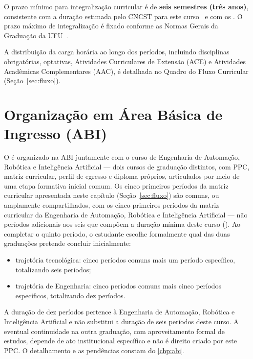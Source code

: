 O prazo mínimo para integralização curricular é de \textbf{seis semestres (três anos)}, consistente com a duração estimada pelo CNCST para este curso~\cite{mec_cncst_2024} e com os \unskip. O prazo máximo de integralização é fixado conforme as Normas Gerais da Graduação da UFU~\cite{ufu_congrad_46_2022}.

A distribuição da carga horária ao longo dos períodos, incluindo disciplinas obrigatórias, optativas, Atividades Curriculares de Extensão (ACE) e Atividades Acadêmicas Complementares (AAC), é detalhada no Quadro do Fluxo Curricular (Seção~\ref{sec:fluxo}).

\section{Organização em Área Básica de Ingresso (ABI)}
\label{sec:abi_estrutura}

O \ppccurso é organizado na ABI juntamente com o curso de Engenharia de Automação, Robótica e Inteligência Artificial — dois cursos de graduação distintos, com PPC, matriz curricular, perfil de egresso e diploma próprios, articulados por meio de uma etapa formativa inicial comum. Os cinco primeiros períodos da matriz curricular apresentada neste capítulo (Seção~\ref{sec:fluxo}) são comuns, ou amplamente compartilhados, com os cinco primeiros períodos da matriz curricular da Engenharia de Automação, Robótica e Inteligência Artificial — não períodos adicionais aos seis que compõem a duração mínima deste curso (\ppctempominimo). Ao completar o quinto período, o estudante escolhe formalmente qual das duas graduações pretende concluir inicialmente:

\begin{itemize}
    \item trajetória tecnológica: cinco períodos comuns mais um período específico, totalizando seis períodos;
    \item trajetória de Engenharia: cinco períodos comuns mais cinco períodos específicos, totalizando dez períodos.
\end{itemize}

A duração de dez períodos pertence à Engenharia de Automação, Robótica e Inteligência Artificial e não substitui a duração de seis períodos deste curso. A eventual continuidade na outra graduação, com aproveitamento formal de estudos, depende de ato institucional específico e não é direito criado por este PPC. O detalhamento e as pendências constam do \autoref{chp:abi}.

